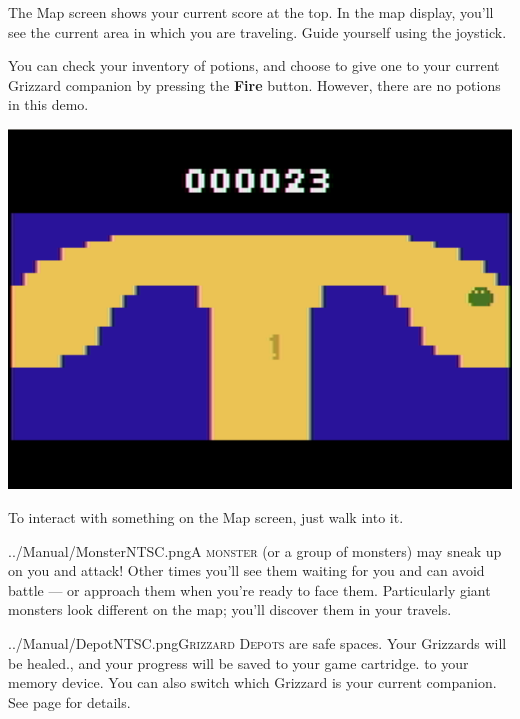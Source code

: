 \documentclass[10pt,twocolumn,openany,article]{memoir}
\begin{document}
The Map screen shows your current score  at the top. In the map display,
you'll see the  current area in which you are  traveling. Guide yourself
using the joystick.

You can check your inventory of potions,  and choose to give one to your
current  Grizzard  companion  by   pressing  the  \textbf{Fire}  button.
\ifdefined\DEMO However, there are no potions in this demo. \fi

\begin{center}
  \includegraphics[width=\columnwidth]{../Manual/MapNTSC.png}
\end{center}

To interact with something on the Map screen, just walk into it.

\lettrine[image=true,                lines=5,               findent=3pt,
nindent=3pt]{../Manual/MonsterNTSC.png}{A   monster}  (or   a  group   of
monsters) may  sneak up on you  and attack! Other times  you'll see them
waiting for  you and can avoid  battle --- or approach  them when you're
ready to  face them. Particularly  giant monsters look different  on the
map; you'll discover them in your travels.

\lettrine[image=true,                lines=5,               findent=3pt,
nindent=3pt]{../Manual/DepotNTSC.png}{Grizzard  Depots} are  safe spaces.
Your  Grizzards will  be  healed\ifdefined\NOSAVE{}.{}\else{}, and  your
progress will  be saved \ifdefined\ATARIAGESAVE to  your game cartridge.
\else to your  memory device. \fi You can also  switch which Grizzard is
your  current   companion.  \fi  See   page  \pageref{sec:GrizzardDepot}
for details.
\end{document}
